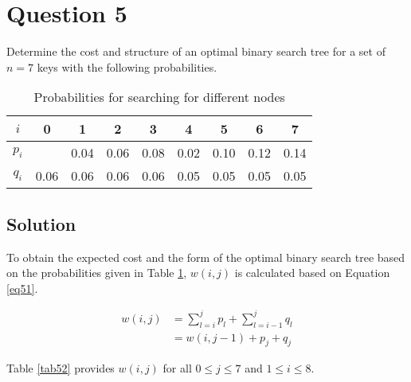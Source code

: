 
\section*{Question 5}

Determine the cost and structure of an optimal binary search tree for a set of $n = 7$ keys with the following probabilities.

\begin{table}[H]\centering
\begin{tabular}{c|c c c c c c c c}
$i$ & 0 & 1 & 2 & 3 & 4 & 5 & 6 & 7\\
\hline
$p_i$ &      & 0.04 & 0.06 & 0.08 & 0.02 & 0.10 & 0.12 & 0.14\\
$q_i$ & 0.06 & 0.06 & 0.06 & 0.06 & 0.05 & 0.05 & 0.05 & 0.05\\
\end{tabular}
\caption{Probabilities for searching for different nodes}\label{tab51}
\end{table}

\subsection*{Solution}

To obtain the expected cost and the form of the optimal binary search tree based on the probabilities given in Table \ref{tab51}, $w(i,j)$ is calculated based on Equation \ref{eq51}.

\begin{equation}\label{eq51}
\begin{aligned}
w(i,j) &= \sum_{l = i}^{j} p_l + \sum_{l = i-1}^{j} q_l\\
&= w(i, j-1) + p_j + q_j
\end{aligned}
\end{equation}

Table \ref{tab52} provides $w(i,j)$ for all $0 \leq j \leq 7$ and $1 \leq i \leq 8$.

